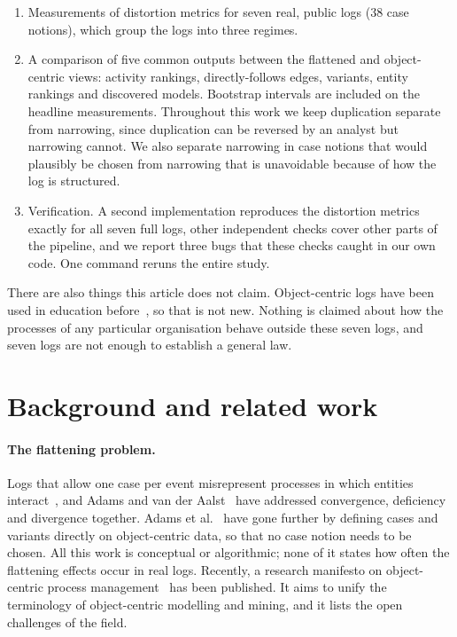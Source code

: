 \documentclass[pdflatex,sn-mathphys-num]{sn-jnl}
\begin{document}
\begin{enumerate}
\item Measurements of distortion metrics for seven real, public logs (38 case notions), which group the logs into three regimes.
\item A comparison of five common outputs between the flattened and object-centric views: activity rankings, directly-follows edges, variants, entity rankings and discovered models. Bootstrap intervals are included on the headline measurements. Throughout this work we keep duplication separate from narrowing, since duplication can be reversed by an analyst but narrowing cannot. We also separate narrowing in case notions that would plausibly be chosen from narrowing that is unavoidable because of how the log is structured.
\item Verification. A second implementation reproduces the distortion metrics exactly for all seven full logs, other independent checks cover other parts of the pipeline, and we report three bugs that these checks caught in our own code. One command reruns the entire study.
\end{enumerate}

There are also things this article does not claim. Object-centric logs have been used in education before~\cite{miri2026educational}, so that is not new. Nothing is claimed about how the processes of any particular organisation behave outside these seven logs, and seven logs are not enough to establish a general law.

\section{Background and related work}\label{sec:related}

\paragraph{The flattening problem.} Logs that allow one case per event misrepresent processes in which entities interact~\cite{vanderaalst2019ocpm}, and Adams and van der Aalst~\cite{adams2024addressing} have addressed convergence, deficiency and divergence together. Adams et al.~\cite{adams2022cases} have gone further by defining cases and variants directly on object-centric data, so that no case notion needs to be chosen. All this work is conceptual or algorithmic; none of it states how often the flattening effects occur in real logs. Recently, a research manifesto on object-centric process management~\cite{seidel2026manifesto} has been published. It aims to unify the terminology of object-centric modelling and mining, and it lists the open challenges of the field.
\end{document}

